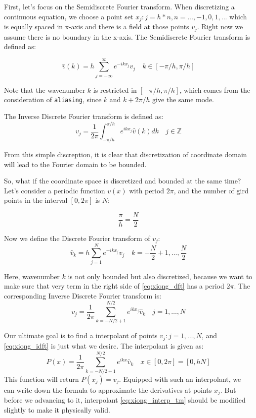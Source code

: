 First, let's focus on the Semidiscrete Fourier transform. When discretizing a
continuous equation, we choose a point set
${x_{j}:j=h*n,n=..., -1,0,1,...}$ which is equally spaced in x-axis and there
is a field at those points $v_j$. Right now
we assume there is no boundary in the x-axis. The Semidiscrete Fourier transform
is defined as:

\begin{equation}
 \hat{v}(k)=h\sum_{j=-\infty}^{\infty}e^{-ikx_{j}}v_{j} \quad k\in  [-\pi/h,\pi/h]
\end{equation}

Note that the wavenumber $k$ is restricted in $[-\pi/h,\pi/h]$, which comes from the
consideration of \texttt{aliasing}, since $k$ and $k+2\pi/h$ give the same mode.

The Inverse Discrete Fourier transform is defined as:
\begin{equation}
 v_{j}=\frac{1}{2\pi}\int_{-\pi/h}^{\pi/h}e^{ikx_{j}}\hat{v}(k)dk \quad j\in \mathbb{Z}
\end{equation}

From this simple discreption, it is clear that discretization of coordinate domain will
lead to the Fourier domain to be bounded.

So, what if the coordinate space is discretized and bounded at the same time? Let's
consider a periodic function $v(x)$ with period $2\pi$, and the number of gird points in
the interval $[0,2\pi]$ is $N$:

\begin{equation}
 \frac{\pi}{h}=\frac{N}{2}
\end{equation}

Now we define the Discrete Fourier transform of $v_{j}$:
\begin{equation}
\label{eq:xiong_dft}
 \hat{v}_{k}=h\sum_{j=1}^{N}e^{-ikx_{j}}v_{j} \quad k=-\frac{N}{2}+1,\dots ,\frac{N}{2}
\end{equation}

Here, wavenumber $k$ is not only bounded but also discretized, because we want to make
sure that very term in the right side of \eqref{eq:xiong_dft} has a period $2\pi$.
The corresponding Inverse Discrete Fourier transform is:
\begin{equation}
\label{eq:xiong_idft}
 v_{j}=\frac{1}{2\pi}\sum_{k=-N/2+1}^{N/2}e^{ikx_{j}}\hat{v}_{k} \quad j=1,\dots ,N
\end{equation}

Our ultimate goal is to find a interpolant of points ${v_{j}:j=1,\dots ,N}$, and
\eqref{eq:xiong_idft} is just what we desire. The interpolant is given as:
\begin{equation}
\label{eq:xiong_interp_tm}
 P(x)=\frac{1}{2\pi}\sum_{k=-N/2+1}^{N/2}e^{ikx}\hat{v}_{k} \quad
 x\in [0,2\pi]=[0,hN]
\end{equation}
This function will return $P(x_{j})=v_{j}$. Equipped with such an interpolant, we can
write down the formula to approximate the derivatives at points ${x_{j}}$. But before
we advancing to it, interpolant \eqref{eq:xiong_interp_tm} should be modified slightly
to make it physically valid.

